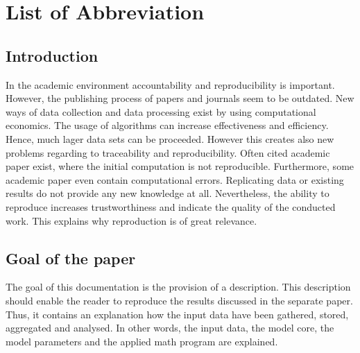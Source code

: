 \documentclass[a4paper,12pt]{article}
\begin{document}
    \clearpage
    \tableofcontents
    
    \clearpage
    
    \listoffigures 	
    \section*{List of Abbreviation} 
	\begin{acronym}[ASECRETTT] 
	\end{acronym}
    \clearpage
    



\begin{spacing}{1.2}
\cleardoublepage{}
\section{Introduction}
In the academic environment accountability and reproducibility is important. However, the publishing process of papers and journals seem to be outdated. New ways of data collection and data processing exist by using computational economics. The usage of algorithms can increase effectiveness and efficiency. Hence, much lager data sets can be proceeded. However this creates also new problems regarding to traceability and reproducibility. Often cited academic paper exist, where the initial computation is not reproducible. Furthermore, some academic paper even contain computational errors. Replicating data or existing results do not provide any new knowledge at all. Nevertheless, the ability to reproduce increases trustworthiness and indicate the quality of the conducted work. This explains why reproduction is of great relevance.

\subsection{Goal of the paper}
The goal of this documentation is the provision of a description. This description should enable the reader to reproduce the results discussed in the separate paper. Thus, it contains an explanation how the input data have been gathered, stored, aggregated and analysed. In other words, the input data, the model core, the model parameters and the applied math program are explained.


\end{spacing}
\end{document}
